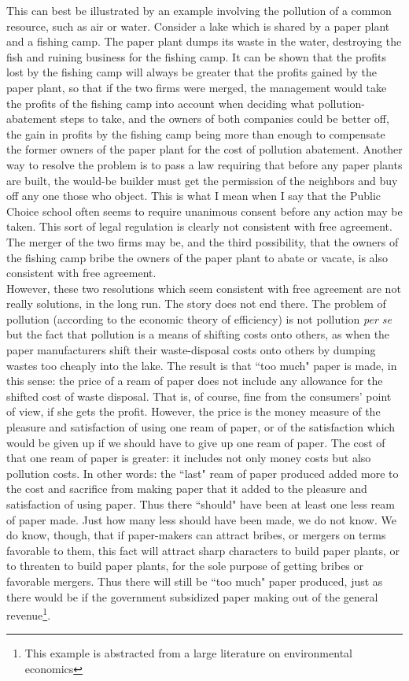 \documentclass[12pt, onecolumn, letterpaper, oneside]{book}
\begin{document}
This can best be illustrated by an example involving the pollution of a common resource, such as air or water. Consider a lake which is shared by a paper plant and a fishing camp. The paper plant dumps its waste in the water, destroying the fish and ruining business for the fishing camp. It can be shown that the profits lost by the fishing camp will always be greater that the profits gained by the paper plant, so that if the two firms were merged, the management would take the profits of the fishing camp into account when deciding what pollution-abatement steps to take, and the owners of both companies could be better off, the gain in profits by the fishing camp being more than enough to compensate the former owners of the paper plant for the cost of pollution abatement. Another way to resolve the problem is to pass a law requiring that before any paper plants are built, the would-be builder must get the permission of the neighbors and buy off any one those who object. This is what I mean when I say that the Public Choice school often seems to require unanimous consent before any action may be taken. This sort of legal regulation is clearly not consistent with free agreement. The merger of the two firms may be, and the third possibility, that the owners of the fishing camp bribe the owners of the paper plant to abate or vacate, is also consistent with free agreement.\\
However, these two resolutions which seem consistent with free agreement are not really solutions, in the long run. The story does not end there. The problem of pollution (according to the economic theory of efficiency) is not pollution \emph{per se} but the fact that pollution is a means of shifting costs onto others, as when the paper manufacturers shift their waste-disposal costs onto others by dumping wastes too cheaply into the lake. The result is that ``too much" paper is made, in this sense: the price of a ream of paper does not include any allowance for the shifted cost of waste disposal. That is, of course, fine from the consumers' point of view, if she gets the profit. However, the price is the money measure of the pleasure and satisfaction of using one ream of paper, or of the satisfaction which would be given up if we should have to give up one ream of paper. The cost of that one ream of paper is greater: it includes not only money costs but also pollution costs. In other words: the ``last" ream of paper produced added more to the cost and sacrifice from making paper that it added to the pleasure and satisfaction of using paper. Thus there ``should" have been at least one less ream of paper made. Just how many less should have been made, we do not know. We do know, though, that if paper-makers can attract bribes, or mergers on terms favorable to them, this fact will attract sharp characters to build paper plants, or to threaten to build paper plants, for the sole purpose of getting bribes or favorable mergers. Thus there will still be ``too much" paper produced, just as there would be if the government subsidized paper making out of the general revenue\footnote{This example is abstracted from a large literature on environmental economics}.\\
\end{document}
